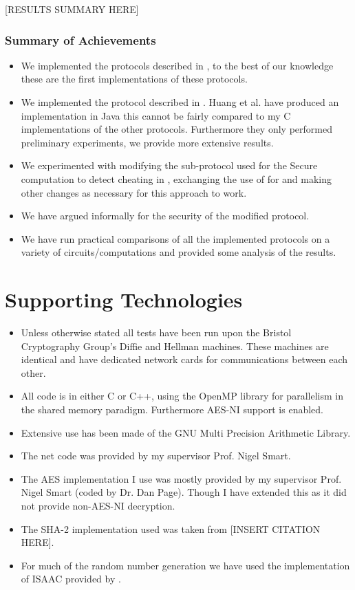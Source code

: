 \documentclass[ %
                    author={Nicholas Tutte},
                supervisor={Prof. Nigel Smart},
                    degree={MEng},
                     title={Secure Two Party Computation},
                  subtitle={A practical comparison of recent protocols},
                      type={Research - GG1K},
                      year={2015} ]{dissertation}
\begin{document}
			  [RESULTS SUMMARY HERE]

			\subsubsection*{Summary of Achievements}
				\begin{itemize}
					\item We implemented the protocols described in \cite{LindellAndPinkas2011, Lindell_CnC_2013}, to the best of our knowledge these are the first implementations of these protocols.
					\item We implemented the protocol described in \cite{Katz_Symm_CnC_2013}. Huang et al. have produced an implementation in Java this cannot be fairly compared to my C implementations of the other protocols. Furthermore they only performed preliminary experiments, we provide more extensive results.
					\item We experimented with modifying the sub-protocol used for the Secure computation to detect cheating in \cite{Lindell_CnC_2013}, exchanging the use of \cite{LindellAndPinkas2011} for \cite{Katz_Symm_CnC_2013} and making other changes as necessary for this approach to work.
					\item We have argued informally for the security of the modified protocol.
					\item We have run practical comparisons of all the implemented protocols on a variety of circuits/computations and provided some analysis of the results.
				\end{itemize}

		\section*{Supporting Technologies}
			\begin{itemize}
					\item Unless otherwise stated all tests have been run upon the Bristol Cryptography Group's Diffie and Hellman machines. These machines are identical and have dedicated network cards for communications between each other.
					\item All code is in either C or C++, using the OpenMP library for parallelism in the shared memory paradigm. Furthermore AES-NI support is enabled.
					\item Extensive use has been made of the GNU Multi Precision Arithmetic Library.
					\item The net code was provided by my supervisor Prof. Nigel Smart.
					\item The AES implementation I use was mostly provided by my supervisor Prof. Nigel Smart (coded by Dr. Dan Page). Though I have extended this as it did not provide non-AES-NI decryption.
					\item The SHA-2 implementation used was taken from [INSERT CITATION HERE].
					\item For much of the random number generation we have used the implementation of ISAAC provided by \cite{ISAAC_Implementation}.
			\end{itemize}
\end{document}
